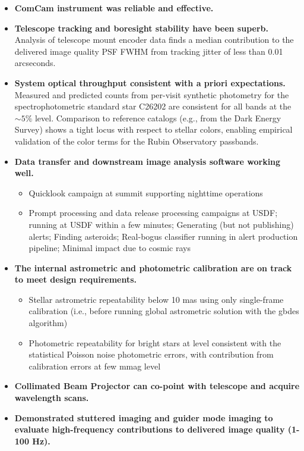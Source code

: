 \begin{itemize}
    \item \textbf{ComCam instrument was reliable and effective.}
    \item \textbf{Telescope tracking and boresight stability have been superb.} Analysis of telescope mount encoder data finds a median contribution to the delivered image quality PSF FWHM from tracking jitter of less than 0.01 arcseconds.
    \item \textbf{System optical throughput consistent with a priori expectations.} Measured and predicted counts from per-visit synthetic photometry for the spectrophotometric standard star C26202 are consistent for all bands at the $\sim5\%$ level.
    Comparison to reference catalogs (e.g., from the Dark Energy Survey) shows a tight locus with respect to stellar colors, enabling empirical validation of the color terms for the Rubin Observatory passbands.
    \item \textbf{Data transfer and downstream image analysis software working well.}
    \begin{itemize}
        \item Quicklook campaign at summit supporting nighttime operations
        \item Prompt processing and data release processing campaigns at USDF; running at USDF within a few minutes; Generating (but not publishing) alerts; Finding asteroids; Real-bogus classifier running in alert production pipeline; Minimal impact due to cosmic rays
    \end{itemize}
    \item \textbf{The internal astrometric and photometric calibration are on track to meet design requirements.}
    \begin{itemize}
        \item Stellar astrometric repeatability below 10 mas using only single-frame calibration (i.e., before running global astrometric solution with the gbdes algorithm)
        \item Photometric repeatability for bright stars at level consistent with the statistical Poisson noise photometric errors, with contribution from calibration errors at few mmag level
    \end{itemize}
    \item \textbf{Collimated Beam Projector can co-point with telescope and acquire wavelength scans.}
    \item \textbf{Demonstrated stuttered imaging and guider mode imaging to evaluate high-frequency contributions to delivered image quality (1-100 Hz).}

\end{itemize}
